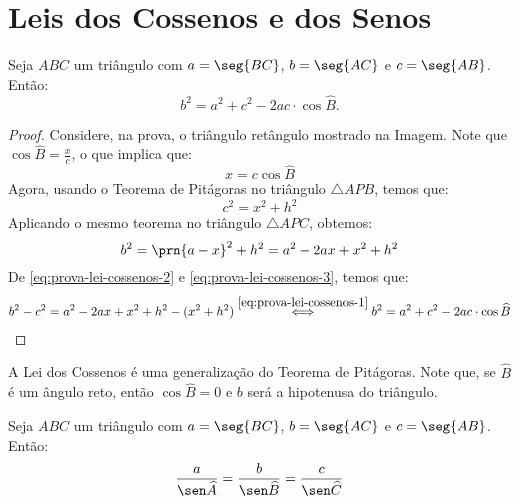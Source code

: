 \section{Leis dos Cossenos e dos Senos}

\begin{theorem}
    Seja $ABC$ um triângulo com $a = \seg {BC}$, $b = \seg {AC}$ e $c = \seg
{AB}$. Então:
$$b^2 = a^2 + c^2 - 2 ac \cdot \cos \widehat B.$$
\end{theorem}

\begin{proof}
    Considere, na prova, o triângulo retângulo mostrado na Imagem. %
    Note que $\cos \widehat B = \frac x c$, o que implica que:
    \begin{equation}
    \label{eq:prova-lei-cossenos-1}
        x = c \cos \widehat B
    \end{equation}
    Agora, usando o Teorema de Pitágoras no triângulo $\triangle APB$, temos que:
    \begin{equation}
    \label{eq:prova-lei-cossenos-2}
        c^2 = x^2 + h^2
    \end{equation}
    Aplicando o mesmo teorema no triângulo $\triangle APC$, obtemos:
    \begin{equation}
    \label{eq:prova-lei-cossenos-3}
        b^2 = \prn{a-x}^2+h^2 = a^2 - 2ax+x^2 + h^2
    \end{equation}
    De \ref{eq:prova-lei-cossenos-2} e \ref{eq:prova-lei-cossenos-3}, temos que:
    \begin{align*}
        b^2 - c^2 = a^2 - 2ax + x^2 + h^2    -(x^2 + h^2) \stackrel{\ref{eq:prova-lei-cossenos-1}}{\iff} b^2 = a^2 + c^2 -2ac \cdot \cos \widehat B
    \end{align*}
\end{proof}

\begin{remark}
    A Lei dos Cossenos é uma generalização do Teorema de Pitágoras. Note
que, se $\widehat B$ é um ângulo reto, então $\cos \widehat B = 0$ e
$b$ será a hipotenusa do triângulo.
\end{remark}

\begin{theorem}
    Seja $ABC$ um triângulo com $a = \seg {BC}$, $b = \seg {AC}$ e $c = \seg
{AB}$. Então:
$$\frac a {\sen \widehat A} = \frac b {\sen \widehat B} = \frac c {\sen \widehat C}$$
\end{theorem}

